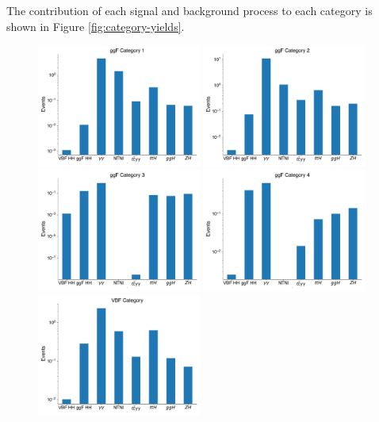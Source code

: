 The contribution of each signal and background process to each category is shown in Figure \ref{fig:category-yields}.

\begin{figure}[p!]
  \centering
  \includegraphics[width=0.48\textwidth]{chapters/chapter6_vbf/images/category_breakdown/ggfcat1.pdf}
  \includegraphics[width=0.48\textwidth]{chapters/chapter6_vbf/images/category_breakdown/ggfcat2.pdf}
  \includegraphics[width=0.48\textwidth]{chapters/chapter6_vbf/images/category_breakdown/ggfcat3.pdf}
  \includegraphics[width=0.48\textwidth]{chapters/chapter6_vbf/images/category_breakdown/ggfcat4.pdf}
  \includegraphics[width=0.48\textwidth]{chapters/chapter6_vbf/images/category_breakdown/vbfcat.pdf}

\end{figure}
